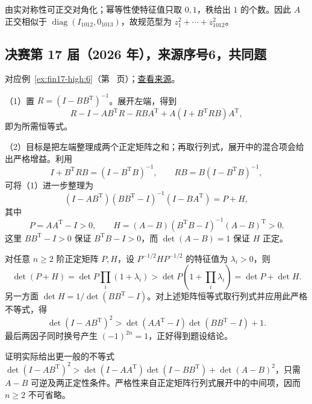 \documentclass[12pt,fontset=fandol]{ctexart}
\begin{document}
\begin{solve}

由实对称性可正交对角化；幂等性使特征值只取 $0,1$，秩给出 $1$ 的个数。因此 $A$ 正交相似于 $\operatorname{diag}(I_{1012},0_{1013})$，故规范型为 $\boxed{z_1^2+\cdots+z_{1012}^2}$。

\end{solve}

\subsection{决赛第 17 届（2026 年），来源序号6，共同题}\label{ans:fin17-high:6}\label{pr:fin17-high:6}

对应例~\ref{ex:fin17-high:6}（第~\pageref{ex:fin17-high:6} 页）；\href{https://github.com/lzxcr/cmc-mathematics/blob/64916fa1fdbc3e444a652eca204d5669058ee321/src/problems/finals/17/06.md}{查看来源}。

\begin{solve}

（1）置 $R=(I-BB^{\mathrm T})^{-1}$。展开左端，得到
\[
R-I-AB^{\mathrm T}R-RBA^{\mathrm T}
+A(I+B^{\mathrm T}RB)A^{\mathrm T},
\]
即为所需恒等式。

（2）目标是把左端整理成两个正定矩阵之和；再取行列式，展开中的混合项会给出严格增益。利用
\[
I+B^{\mathrm T}RB=(I-B^{\mathrm T}B)^{-1},\qquad
RB=B(I-B^{\mathrm T}B)^{-1},
\]
可将（1）进一步整理为
\[
(I-AB^{\mathrm T})(BB^{\mathrm T}-I)^{-1}(I-BA^{\mathrm T})=P+H,
\]
其中
\[
P=AA^{\mathrm T}-I>0,\qquad
H=(A-B)(B^{\mathrm T}B-I)^{-1}(A-B)^{\mathrm T}>0.
\]
这里 $BB^{\mathrm T}-I>0$ 保证 $B^{\mathrm T}B-I>0$，而 $\det(A-B)=1$ 保证 $H$ 正定。

对任意 $n\ge2$ 阶正定矩阵 $P,H$，设 $P^{-1/2}HP^{-1/2}$ 的特征值为 $\lambda_i>0$，则
\[
\det(P+H)=\det P\prod_i(1+\lambda_i)
>\det P\left(1+\prod_i\lambda_i\right)=\det P+\det H.
\]
另一方面 $\det H=1/\det(BB^{\mathrm T}-I)$。对上述矩阵恒等式取行列式并应用此严格不等式，得
\[
\det(I-AB^{\mathrm T})^2>
\det(AA^{\mathrm T}-I)\det(BB^{\mathrm T}-I)+1.
\]
最后两因子同时换号产生 $(-1)^{2n}=1$，正好得到题设结论。

\end{solve}

\begin{remark}[方法与条件]

证明实际给出更一般的不等式
$\det(I-AB^{\mathrm T})^2>\det(I-AA^{\mathrm T})\det(I-BB^{\mathrm T})+\det(A-B)^2$，只需 $A-B$ 可逆及两正定性条件。严格性来自正定矩阵行列式展开中的中间项，因而 $n\ge2$ 不可省略。

\end{remark}
\end{document}
